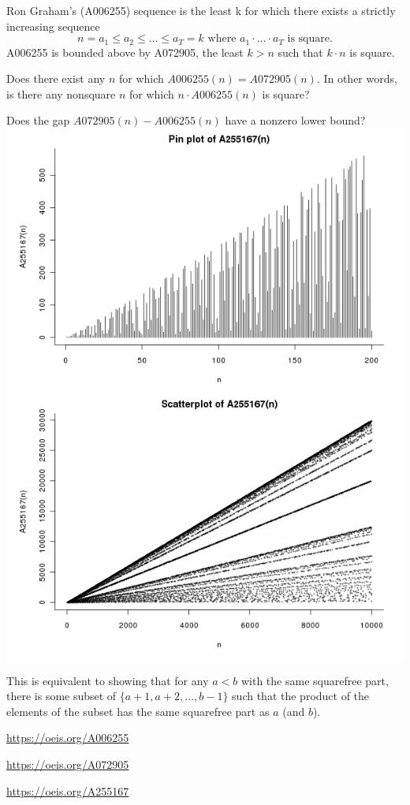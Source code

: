 \documentclass{article}
\begin{document}
Ron Graham's (A006255) sequence is the least k for which there exists a
strictly increasing sequence \[
  n = a_1 \leq a_2 \leq \hdots \leq a_T = k \text{ where }
  a_1 \cdot\hdots\cdot a_T \text{ is square.}
\]
A006255 is bounded above by A072905, the least $k > n$ such that $k\cdot n$
is square.
\begin{question}
  Does there exist any $n$ for which $A006255(n) = A072905(n)$. In other words,
  is there any nonsquare $n$ for which $n \cdot A006255(n)$ is square?
\end{question}

\begin{related}
  \item Does the gap $A072905(n) - A006255(n)$ have a nonzero lower bound?\\
    \includegraphics[trim={0cm 0 0 14cm},clip,scale=0.7]{assets/018_problem_A255167}
\end{related}

\begin{note}
  This is equivalent to showing that for any $a < b$ with the same
  squarefree part, there is some subset of $\{ a + 1, a + 2, \hdots, b - 1 \}$
  such that the product of the elements of the subset has the same squarefree
  part as $a$ (and $b$).
\end{note}

\begin{references}
  \item \url{https://oeis.org/A006255}
  \item \url{https://oeis.org/A072905}
  \item \url{https://oeis.org/A255167}
\end{references}
\end{document}
